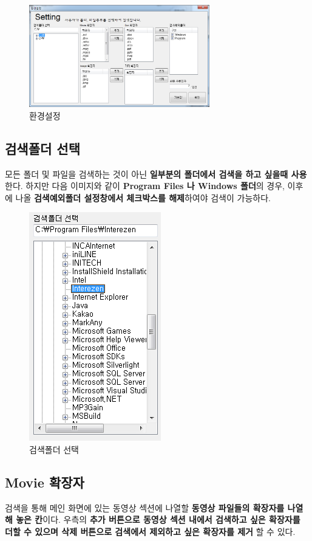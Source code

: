 \documentclass[a4paper, 13pt]{article} %
\begin{document}
	\begin{figure}[h]
		\centering
		\includegraphics[width=0.7\textwidth]{Figures/Setting}
		\caption{환경설정}
		\label{fig:setting}
	\end{figure}

		\subsection{검색폴더 선택}
		모든 폴더 및 파일을 검색하는 것이 아닌 \textbf{일부분의 폴더에서 검색을 하고 싶을때 사용}한다. 하지만 다음 이미지와 같이 \textbf{Program Files 나 Windows 폴더}의 경우, 이후에 나올 \textbf{검색예외폴더 설정창에서 체크박스를 해제}하여야 검색이 가능하다.
		
		\begin{figure}[h]
			\centering
			\includegraphics[height=0.35\textheight]{Figures/searchfolder}
			\caption{검색폴더 선택}
			\label{fig:searchfolder}
		\end{figure}
	
		\newpage
		
		\subsection{Movie 확장자}
		검색을 통해 메인 화면에 있는 동영상 섹션에 나열할 \textbf{동영상 파일들의 확장자를 나열해 놓은 칸}이다.
		우측의 \textbf{추가 버튼으로 동영상 섹션 내에서 검색하고 싶은 확장자를 더할 수 있으며 삭제 버튼으로 검색에서 제외하고 싶은 확장자를 제거} 할 수 있다.
		
\end{document}
